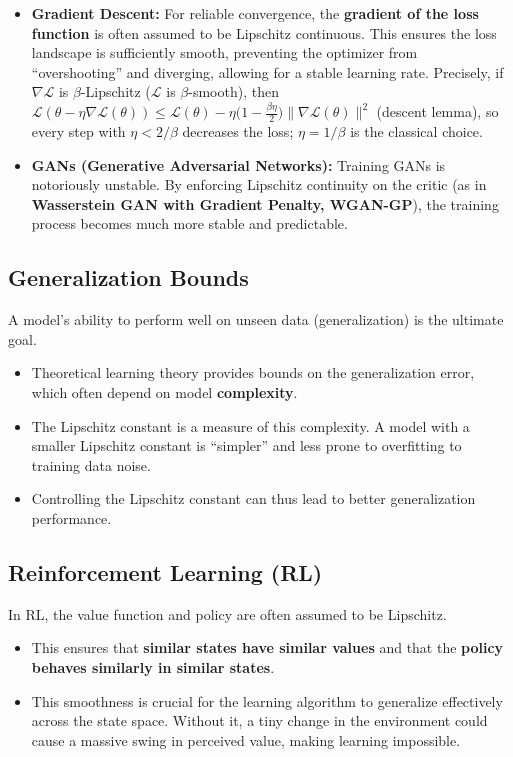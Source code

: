 \begin{notechapter}
\begin{itemize}
    \item \textbf{Gradient Descent:} For reliable convergence, the \textbf{gradient of the loss function} is often assumed to be Lipschitz continuous. This ensures the loss landscape is sufficiently smooth, preventing the optimizer from ``overshooting'' and diverging, allowing for a stable learning rate. Precisely, if \( \nabla \mathcal{L} \) is \( \beta \)-Lipschitz (\( \mathcal{L} \) is \( \beta \)-smooth), then \( \mathcal{L}(\theta - \eta\nabla\mathcal{L}(\theta)) \leq \mathcal{L}(\theta) - \eta\big(1 - \tfrac{\beta\eta}{2}\big)\|\nabla\mathcal{L}(\theta)\|^2 \) (descent lemma), so every step with \( \eta < 2/\beta \) decreases the loss; \( \eta = 1/\beta \) is the classical choice.
    \item \textbf{GANs (Generative Adversarial Networks):} Training GANs is notoriously unstable. By enforcing Lipschitz continuity on the critic (as in \textbf{Wasserstein GAN with Gradient Penalty, WGAN-GP}), the training process becomes much more stable and predictable.
\end{itemize}

\subsection{Generalization Bounds}

A model's ability to perform well on unseen data (generalization) is the ultimate goal.

\begin{itemize}
    \item Theoretical learning theory provides bounds on the generalization error, which often depend on model \textbf{complexity}.
    \item The Lipschitz constant is a measure of this complexity. A model with a smaller Lipschitz constant is ``simpler'' and less prone to overfitting to training data noise.
    \item Controlling the Lipschitz constant can thus lead to better generalization performance.
\end{itemize}

\subsection{Reinforcement Learning (RL)}

In RL, the value function and policy are often assumed to be Lipschitz.

\begin{itemize}
    \item This ensures that \textbf{similar states have similar values} and that the \textbf{policy behaves similarly in similar states}.
    \item This smoothness is crucial for the learning algorithm to generalize effectively across the state space. Without it, a tiny change in the environment could cause a massive swing in perceived value, making learning impossible.
\end{itemize}


\end{notechapter}

